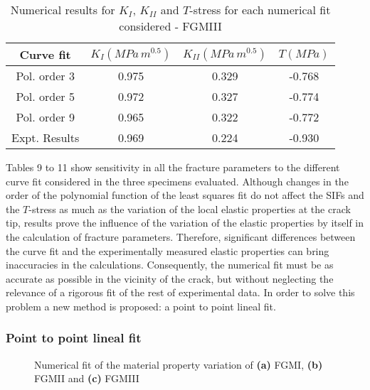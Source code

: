\begin{table*}[htbp]
\caption{Numerical results for $K_I$, $K_{II}$ and $T$-stress for each numerical fit considered - FGMIII}
\centering
\begin{tabular}{c c c c} 
\hline \hline
Curve fit & $K_I (M\!Pa\,m^{0.5})$ & $K_{II} (M\!Pa\,m^{0.5})$ & $T (M\!Pa)$ \\
 \hline
 Pol. order 3 & 0.975 & 0.329 & -0.768\\
 Pol. order 5 & 0.972 & 0.327 & -0.774\\
 Pol. order 9 & 0.965 & 0.322 & -0.772\\
  \hline
 Expt. Results & 0.969 & 0.224 & -0.930\\
 \hline \hline 
\end{tabular}
\label{tab:Table11}
\end{table*}
\vspace{10pt}

Tables 9 to 11 show sensitivity in all the fracture parameters to the different curve fit considered in the three specimens evaluated. Although changes in the order of the polynomial function of the least squares fit do not affect the SIFs and the $T$-stress as much as the variation of the local elastic properties at the crack tip, results prove the influence of the variation of the elastic properties by itself in the calculation of fracture parameters. Therefore, significant differences between the curve fit and the experimentally measured elastic properties can bring inaccuracies in the calculations. Consequently, the numerical fit must be as accurate as possible in the vicinity of the crack, but without neglecting the relevance of a rigorous fit of the rest of experimental data. In order to solve this problem a new method is proposed: a point to point lineal fit.

\subsubsection{Point to point lineal fit}

\begin{figure*}[!ht]
    \hfill
    
    \centering
    \caption{Numerical fit of the material property variation of \textbf{(a)} FGMI, \textbf{(b)} FGMII and \textbf{(c)} FGMIII}
    \label{fig:Fig9}
\end{figure*}

